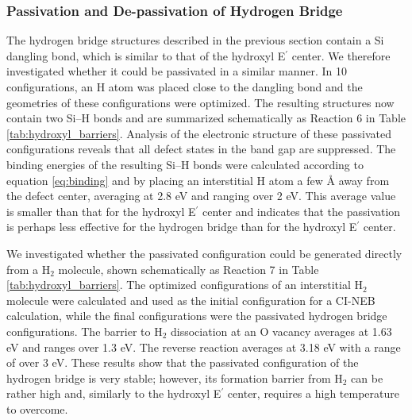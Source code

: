 \documentclass[aps,prb,reprint,superscriptaddress,showpacs]{revtex4-1}
\begin{document}

\subsubsection{Passivation and De-passivation of Hydrogen Bridge}

The hydrogen bridge structures described in the previous section contain a Si dangling bond, which is similar to that of the hydroxyl E$^\prime$ center. We therefore investigated whether it could be passivated in a similar manner. In 10 configurations, an H atom was placed close to the dangling bond and the geometries of these configurations were optimized. The resulting structures now contain two \mbox{Si--H} bonds and are summarized schematically as Reaction 6 in Table \ref{tab:hydroxyl_barriers}. Analysis of the electronic structure of these passivated configurations reveals that all defect states in the band gap are suppressed. The binding energies of the resulting \mbox{Si--H} bonds were calculated according to equation \ref{eq:binding} and by placing an interstitial H atom a few {\AA} away from the defect center, averaging at 2.8 eV and ranging over 2 eV. This average value is smaller than that for the hydroxyl E$^\prime$ center and indicates that the passivation is perhaps less effective for the hydrogen bridge than for the hydroxyl E$^\prime$ center. 

We investigated whether the passivated configuration could be generated directly from a H$_2$ molecule, shown schematically as Reaction 7 in Table \ref{tab:hydroxyl_barriers}. The optimized configurations of an interstitial H$_2$ molecule were calculated and used as the initial configuration for a CI-NEB calculation, while the final configurations were the passivated hydrogen bridge configurations. The barrier to H$_2$ dissociation at an O vacancy averages at 1.63 eV and ranges over 1.3 eV. The reverse reaction averages at 3.18 eV with a range of over 3 eV. These results show that the passivated configuration of the hydrogen bridge is very stable; however, its formation barrier from H$_2$ can be rather high and, similarly to the hydroxyl E$^\prime$ center, requires a high temperature to overcome.
\end{document}
